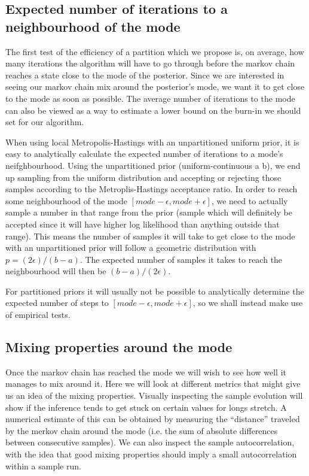 \subsection{Expected number of iterations to a neighbourhood of the mode}
\label{section:sampsToMode}
The first test of the efficiency of a partition which we propose is, on average, how many iterations the algorithm will have to go through before the markov chain reaches a state close to the mode of the posterior. Since we are interested in seeing our markov chain mix around the posterior's mode, we want it to get close to the mode as soon as possible. The average number of iterations to the mode can also be viewed as a way to estimate a lower bound on the burn-in we should set for our algorithm.

When using local Metropolis-Hastings with an unpartitioned uniform prior, it is easy to analytically calculate the expected number of iterations to a mode's neifghbourhood. Using the unpartitioned prior (uniform-continuous a b), we end up sampling from the uniform distribution and accepting or rejecting those samples according to the Metroplis-Hastings acceptance ratio. In order to reach some neighbourhood of the mode $[mode - \epsilon, mode + \epsilon]$, we need to actually sample a number in that range from the prior (sample which will definitely be accepted since it will have higher log likelihood than anything outside that range). This means the number of samples it will take to get close to the mode with an unpartitioned prior will follow a geometric distribution with $p = (2\epsilon)/(b-a)$. The expected number of samples it takes to reach the neighbourhood will then be $(b-a)/(2\epsilon)$.

For partitioned priors it will usually not be possible to analytically determine the expected number of steps to $[mode - \epsilon, mode + \epsilon]$, so we shall instead make use of empirical tests.

\subsection{Mixing properties around the mode}
Once the markov chain has reached the mode we will wish to see how well it manages to mix around it. Here we will look at different metrics that might give us an idea of the mixing properties. Visually inspecting the sample evolution will show if the inference tends to get stuck on certain values for longs stretch. A numerical estimate of this can be obtained by measuring the ``distance'' traveled by the merkov chain around the mode (i.e. the sum of absolute differences between consecutive samples). We can also inspect the sample autocorrelation, with the idea that good mixing properties should imply a small autocorrelation within a sample run.

